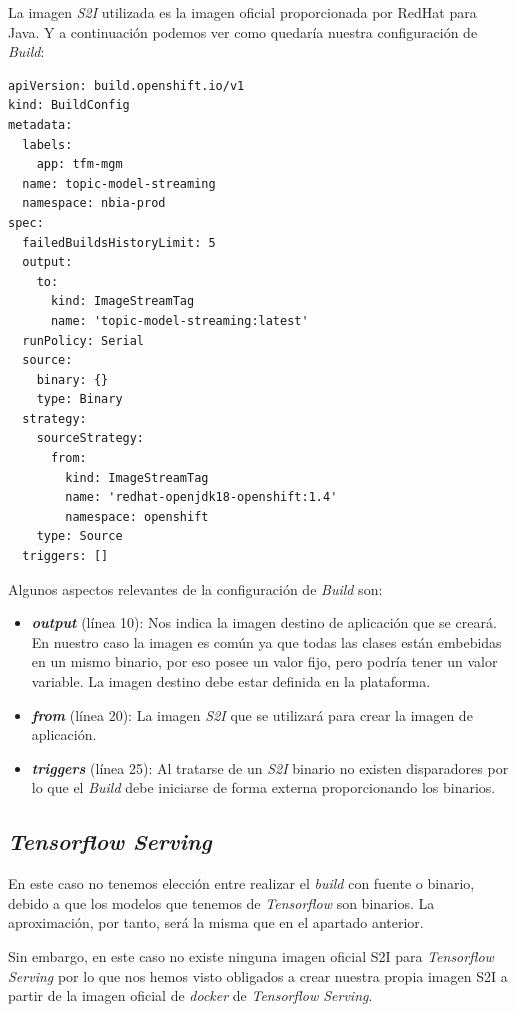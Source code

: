 La imagen \textit{S2I} utilizada es la imagen oficial proporcionada por RedHat para Java. Y a continuación podemos ver como quedaría nuestra configuración de \textit{Build}:

\begin{verbatim}
apiVersion: build.openshift.io/v1
kind: BuildConfig
metadata:
  labels:
    app: tfm-mgm
  name: topic-model-streaming
  namespace: nbia-prod
spec:
  failedBuildsHistoryLimit: 5
  output:
    to:
      kind: ImageStreamTag
      name: 'topic-model-streaming:latest'
  runPolicy: Serial
  source:
    binary: {}
    type: Binary
  strategy:
    sourceStrategy:
      from:
        kind: ImageStreamTag
        name: 'redhat-openjdk18-openshift:1.4'
        namespace: openshift
    type: Source
  triggers: []
\end{verbatim}

Algunos aspectos relevantes de la configuración de \textit{Build} son:

\begin{itemize}
\item \textit{\textbf{output}} (línea 10): Nos indica la imagen destino de aplicación que se creará. En nuestro caso la imagen es común ya que todas las clases están embebidas en un mismo binario, por eso posee un valor fijo, pero podría tener un valor variable. La imagen destino debe estar definida en la plataforma. 

\item \textit{\textbf{from}} (línea 20): La imagen \textit{S2I} que se utilizará para crear la imagen de aplicación.

\item \textit{\textbf{triggers}} (línea 25): Al tratarse de un \textit{S2I} binario no existen disparadores por lo que el \textit{Build} debe iniciarse de forma externa proporcionando los binarios.
 
\end{itemize}


\subsection{\textit{Tensorflow Serving}}

En este caso no tenemos elección entre realizar el \textit{build} con fuente o binario, debido a que los modelos que tenemos de \textit{Tensorflow} son binarios. La aproximación, por tanto, será la misma que en el apartado anterior. 

Sin embargo, en este caso no existe ninguna imagen oficial S2I para \textit{Tensorflow Serving} por lo que nos hemos visto obligados a crear nuestra propia imagen S2I a partir de la imagen oficial de \textit{docker} de \textit{Tensorflow Serving}.

